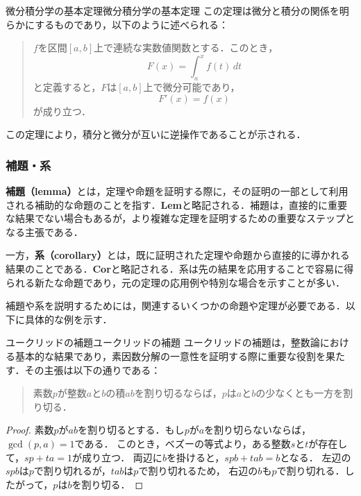 \documentclass[a4paper,11pt]{ltjsarticle}
\renewcommand{\emph}[1]{\textbf{#1}}
\newenvironment{tleftbar}{\begin{tbleftline}\setlength{\parindent}{1\zw}}{\end{tbleftline}}
\begin{document}
  
  \begin{example}{微分積分学の基本定理}{微分積分学の基本定理}
  この定理は微分と積分の関係を明らかにするものであり，以下のように述べられる：
  \begin{quotation}
  $f$を区間$[a, b]$上で連続な実数値関数とする．このとき，
  \[
  F(x) = \int_a^x f(t) \, dt
  \]
  と定義すると，$F$は$[a, b]$上で微分可能であり，
  \[
  F'(x) = f(x)
  \]
  が成り立つ．
  \end{quotation}
  この定理により，積分と微分が互いに逆操作であることが示される．
  \end{example}
\subsubsection{補題・系}

\emph{補題（lemma）}とは，定理や命題を証明する際に，その証明の一部として利用される補助的な命題のことを指す．\textbf{Lem}と略記される．補題は，直接的に重要な結果でない場合もあるが，より複雑な定理を証明するための重要なステップとなる主張である．

一方，\emph{系（corollary）}とは，既に証明された定理や命題から直接的に導かれる結果のことである．\textbf{Cor}と略記される．系は先の結果を応用することで容易に得られる新たな命題であり，元の定理の応用例や特別な場合を示すことが多い．

補題や系を説明するためには，関連するいくつかの命題や定理が必要である．以下に具体的な例を示す．

\begin{example}{ユークリッドの補題}{ユークリッドの補題}
ユークリッドの補題は，整数論における基本的な結果であり，素因数分解の一意性を証明する際に重要な役割を果たす．その主張は以下の通りである：

\begin{quote}
素数$p$が整数$a$と$b$の積$ab$を割り切るならば，$p$は$a$と$b$の少なくとも一方を割り切る．
\end{quote}

\end{example}

\begin{tleftbar}
\begin{proof}
素数$p$が$ab$を割り切るとする．もし$p$が$a$を割り切らないならば，$\gcd(p, a) = 1$である．
このとき，ベズーの等式より，ある整数$s$と$t$が存在して，$sp + ta = 1$が成り立つ．
両辺に$b$を掛けると，$spb + tab = b$となる．
左辺の$spb$は$p$で割り切れるが，$tab$は$p$で割り切れるため，
右辺の$b$も$p$で割り切れる．したがって，$p$は$b$を割り切る．
\end{proof}
\end{tleftbar}
\end{document}
